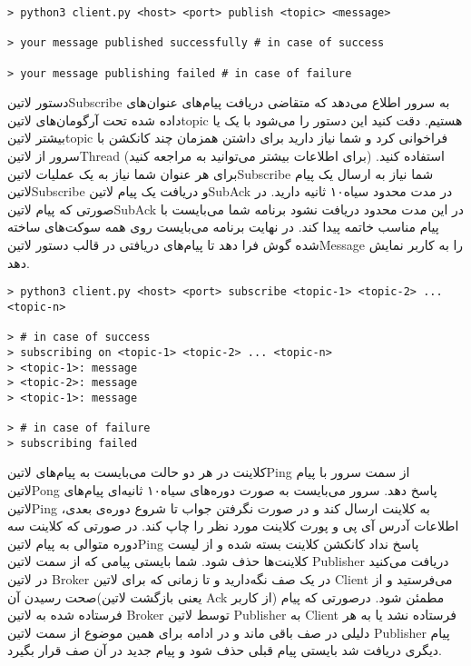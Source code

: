 \documentclass[]{article}
\begin{document}
  \begin{latin}
  \begin{verbatim}
> python3 client.py <host> <port> publish <topic> <message>

> your message published successfully # in case of success

> your message publishing failed # in case of failure
  \end{verbatim}
  \end{latin}

  دستور ‌لاتین{Subscribe} به سرور اطلاع می‌دهد که متقاضی دریافت پیام‌های عنوان‌های داده شده تحت آرگومان‌های ‌لاتین{topic} هستیم.
  دقت کنید این دستور را می‌شود با یک یا بیشتر ‌لاتین{topic} فراخوانی کرد و شما نیاز دارید برای داشتن همزمان چند کانکشن با سرور از ‌لاتین{Thread} (برای اطلاعات بیشتر می‌توانید به  مراجعه کنید) استفاده کنید.
  برای هر عنوان شما نیاز به یک عملیات ‌لاتین{Subscribe} شما نیاز به ارسال یک پیام ‌لاتین{Subscribe} و دریافت یک پیام ‌لاتین{SubAck} در مدت محدود ‌سیاه{۱۰ ثانیه} دارید.
  در صورتی که پیام ‌لاتین{SubAck} در این مدت محدود دریافت نشود برنامه شما می‌بایست با پیام مناسب خاتمه پیدا کند.
  در نهایت برنامه می‌بایست روی همه سوکت‌های ساخته شده گوش فرا دهد تا پیام‌های دریافتی در قالب دستور ‌لاتین{Message} را به کاربر نمایش دهد.

  \begin{latin}
  \begin{verbatim}
> python3 client.py <host> <port> subscribe <topic-1> <topic-2> ... <topic-n>

> # in case of success
> subscribing on <topic-1> <topic-2> ... <topic-n>
> <topic-1>: message
> <topic-2>: message
> <topic-1>: message

> # in case of failure
> subscribing failed
  \end{verbatim}
  \end{latin}



   کلاینت در هر دو حالت می‌بایست به پیام‌های ‌لاتین{Ping} از سمت سرور با پیام ‌لاتین{Pong} پاسخ دهد.
   سرور می‌بایست به صورت دوره‌های ‌سیاه{۱۰ ثانیه‌ای} پیام‌های ‌لاتین{Ping} به کلاینت ارسال کند و در صورت نگرفتن جواب تا شروع دوره‌ی بعدی، اطلاعات آدرس آی پی و پورت کلاینت مورد نظر را چاپ کند.
   در صورتی که کلاینت سه دوره متوالی به پیام ‌لاتین{Ping} پاسخ نداد کانکشن کلاینت بسته شده و از لیست کلاینت‌ها حذف شود.
   شما بایستی پیامی که از سمت  لاتین {Publisher} دریافت می‌کنید در  لاتین {Broker} در یک صف نگه‌دارید و تا زمانی که برای  لاتین {Client} می‌فرستید و از صحت رسیدن آن(یعنی بازگشت  لاتین {Ack} از کاربر) مطمئن شود.
   درصورتی که پیام فرستاده شده به  لاتین  {Broker} توسط  لاتین {Publisher} به {Client} فرستاده نشد یا به هر دلیلی در صف باقی ماند و در ادامه برای همین موضوع از سمت  لاتین {Publisher} پیام دیگری دریافت شد بایستی پیام قبلی حذف شود و پیام جدید در آن صف قرار بگیرد.
\end{document}
